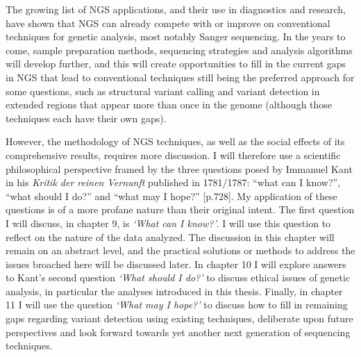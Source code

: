 The growing list of NGS applications, and their use in diagnostics and research, have shown that NGS can already compete with or improve on conventional techniques for genetic analysis, most notably Sanger sequencing. 
In the years to come, sample preparation methods, sequencing strategies and analysis algorithms will develop further, and this will create opportunities to fill in the current gaps in NGS that lead to conventional techniques still being the preferred approach for some questions, such as structural variant calling and variant detection in extended regions that appear more than once in the genome (although those techniques each have their own gaps). 

However, the methodology of NGS techniques, as well as the social effects of its comprehensive results, requires more discussion. 
I will therefore use a scientific philosophical perspective framed by the three questions posed by Immanuel Kant in his \textsl{Kritik der reinen Vernunft} published in 1781/1787: “what can I know?”, “what should I do?” and “what may I hope?” \cite{Kant_1781a}[p.728]. 
My application of these questions is of a more profane nature than their original intent. 
The first question I will discuss, in chapter 9, is \textsl{‘What can I know?’}. 
I will use this question to reflect on the nature of the data analyzed. 
The discussion in this chapter will remain on an abstract level, and the practical solutions or methods to address the issues broached here will be discussed later. 
In chapter 10 I will explore answers to Kant’s second question \textsl{‘What should I do?’} to discuss ethical issues of genetic analysis, in particular the analyses introduced in this thesis. 
Finally, in chapter 11 I will use the question \textsl{‘What may I hope?’} to discuss how to fill in remaining gaps regarding variant detection using existing techniques, deliberate upon future perspectives and look forward towards yet another next generation of sequencing techniques.
